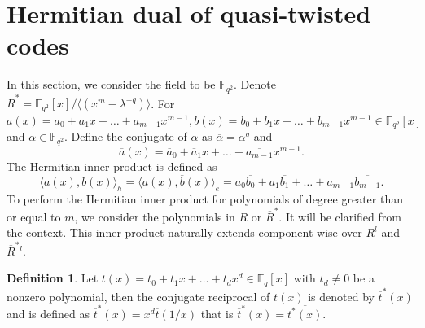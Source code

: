\documentclass[12 pt]{extarticle}
\numberwithin{equation}{section}
\theoremstyle{definition}
\newtheorem{definition}{Definition}[section]
\begin{document}
\section{Hermitian dual of quasi-twisted codes}\label{dualcodesh}
In this section, we consider the field to be $\mathbb{F}_{q^2}$. Denote $\overline{R}^{*}=\mathbb{F}_{q^2}[x]/\langle (x^m-\lambda^{-q})\rangle$.
For $a(x)=a_0+a_1x+\dots +a_{m-1}x^{m-1}, b(x)=b_0+b_1x+\dots +b_{m-1}x^{m-1}\in \mathbb{F}_{q^2}[x]$ and $\alpha\in \mathbb{F}_{q^2}$. Define the conjugate of $\alpha$ as $\overline{\alpha}=\alpha^q$ and
$$\overline{a}(x)=\overline{a}_0+\overline{a}_1x+\dots +\overline{a_{m-1}}x^{m-1}.$$
The Hermitian inner product is defined as
$$\langle a(x),b(x)\rangle_h=\langle a(x),\overline{b}(x)\rangle_e=a_0\overline{b_0}+a_1\overline{b_1}+\dots+a_{m-1}\overline{b_{m-1}}.$$
To perform the Hermitian inner product for polynomials of degree greater than or equal to $m$, we consider the polynomials in $R$ or $\overline{R}^*$. It will be clarified from the context.  This inner product naturally extends component wise over $R^l$ and $\overline{R}^*{^l}$.
\begin{definition}
    Let $t(x)=t_0+t_1x+\dots+t_dx^d\in \mathbb{F}_{q}[x]$ with $t_d\neq 0$ be a nonzero polynomial, then the conjugate reciprocal of $t(x)$ is denoted by $\overline{t}^*(x)$ and is defined as $\overline{t}^*(x)=x^d\overline{t}(1/x)$ that is $\overline{t}^*(x)=\overline{t^*(x)}$.
\end{definition}
\end{document}

